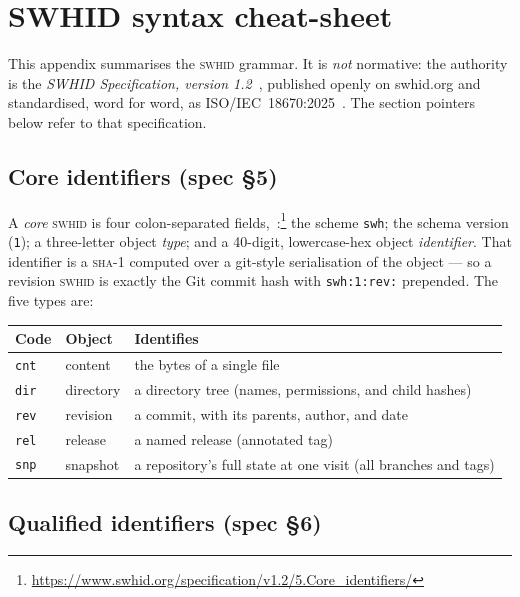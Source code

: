 \chapter{SWHID syntax cheat-sheet}
\label{app:swhid-syntax}

This appendix summarises the \textsc{swhid} grammar. It is \emph{not} normative: the authority is
the \emph{SWHID Specification, version 1.2}~\autocite{swhidspec}, published openly on
swhid.org and standardised, word for word, as ISO/IEC~18670:2025~\autocite{isoiec18670}. The
section pointers below refer to that specification.

\section{Core identifiers (spec \S5)}

A \emph{core} \textsc{swhid} is four colon-separated fields,
\,:\footnote{\url{https://www.swhid.org/specification/v1.2/5.Core_identifiers/}}
the scheme \texttt{swh}; the schema version (\texttt{1}); a three-letter object \emph{type}; and a
40-digit, lowercase-hex object \emph{identifier}. That identifier is a \textsc{sha}-1 computed over a
git-style serialisation of the object --- so a revision \textsc{swhid} is exactly the Git commit
hash with \texttt{swh:1:rev:} prepended. The five types are:

\begin{table}[htbp]
  \centering\small
  \begin{tabularx}{\linewidth}{@{}llX@{}}
    \toprule
    \textbf{Code} & \textbf{Object} & \textbf{Identifies} \\
    \midrule
    \texttt{cnt} & content   & the bytes of a single file \\
    \texttt{dir} & directory & a directory tree (names, permissions, and child hashes) \\
    \texttt{rev} & revision  & a commit, with its parents, author, and date \\
    \texttt{rel} & release   & a named release (annotated tag) \\
    \texttt{snp} & snapshot  & a repository's full state at one visit (all branches and tags) \\
    \bottomrule
  \end{tabularx}
\end{table}

\section{Qualified identifiers (spec \S6)}


